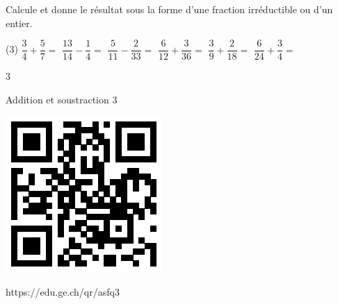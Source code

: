\documentclass[a4paper,11pt]{report}
\begin{document}
\begin{exo}
{Calcule et donne le résultat sous la forme d'une fraction irréductible ou d'un entier.
\begin{tasks}(3)
\task $\dfrac{3}{4}+\dfrac{5}{7}=$
\task $\dfrac{13}{14}-\dfrac{1}{4}=$
\task $\dfrac{5}{11}-\dfrac{2}{33}=$
\task $\dfrac{6}{12}+\dfrac{3}{36}=$
\task $\dfrac{3}{9}+\dfrac{2}{18}=$
\task $\dfrac{6}{24}+\dfrac{3}{4}=$
\end{tasks}    
}{3}
\end{exo}

\begin{qmun}{Addition et soustraction 3}{
		\begin{center}
\includegraphics[scale=1]{media/qr/asfq3}

\tiny{{https://edu.ge.ch/qr/asfq3}}
		\end{center}
	}
\end{qmun}
\end{document}
